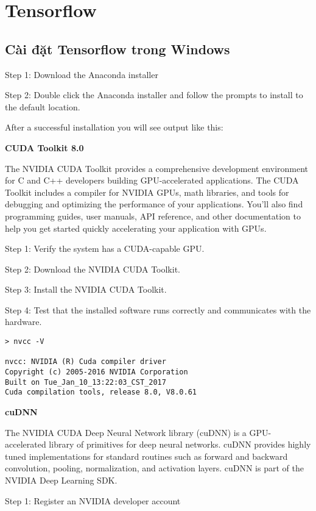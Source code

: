 \chapter{Tensorflow}

\section{Cài đặt Tensorflow trong Windows}

Step 1: Download the Anaconda installer

Step 2: Double click the Anaconda installer and follow the prompts to install to the default location.

After a successful installation you will see output like this:

\textbf{CUDA Toolkit 8.0}

The NVIDIA CUDA Toolkit provides a comprehensive development environment for C and C++ developers building GPU-accelerated applications. The CUDA Toolkit includes a compiler for NVIDIA GPUs, math libraries, and tools for debugging and optimizing the performance of your applications. You’ll also find programming guides, user manuals, API reference, and other documentation to help you get started quickly accelerating your application with GPUs.

Step 1: Verify the system has a CUDA-capable GPU.

Step 2: Download the NVIDIA CUDA Toolkit.

Step 3: Install the NVIDIA CUDA Toolkit.

Step 4: Test that the installed software runs correctly and communicates with the hardware.

\begin{lstlisting}
> nvcc -V

nvcc: NVIDIA (R) Cuda compiler driver
Copyright (c) 2005-2016 NVIDIA Corporation
Built on Tue_Jan_10_13:22:03_CST_2017
Cuda compilation tools, release 8.0, V8.0.61
\end{lstlisting}

\textbf{cuDNN}


The NVIDIA CUDA Deep Neural Network library (cuDNN) is a GPU-accelerated library of primitives for deep neural networks. cuDNN provides highly tuned implementations for standard routines such as forward and backward convolution, pooling, normalization, and activation layers. cuDNN is part of the NVIDIA Deep Learning SDK.

Step 1: Register an NVIDIA developer account

